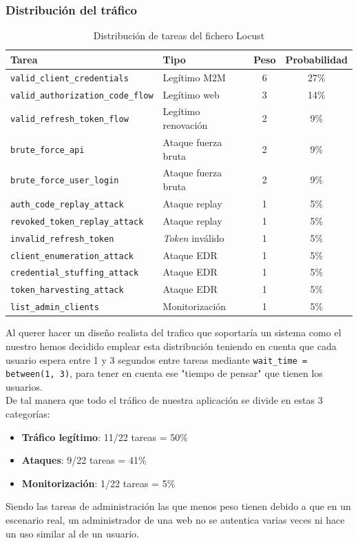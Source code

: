 \documentclass[12pt, a4paper]{article}
\begin{document}
		\subsubsection{Distribución del tráfico}
			\begin{table}[H]
				\centering
				\begin{tabular}{llcc}
					\toprule
					\textbf{Tarea} & \textbf{Tipo} & \textbf{Peso} & \textbf{Probabilidad} \\
					\midrule
					\texttt{valid\_client\_credentials}      & Legítimo M2M         & 6 & 27\% \\
					\texttt{valid\_authorization\_code\_flow} & Legítimo web         & 3 & 14\% \\
					\texttt{valid\_refresh\_token\_flow}      & Legítimo renovación  & 2 & 9\%  \\
					\texttt{brute\_force\_api}               & Ataque fuerza bruta  & 2 & 9\%  \\
					\texttt{brute\_force\_user\_login}        & Ataque fuerza bruta  & 2 & 9\%  \\
					\texttt{auth\_code\_replay\_attack}       & Ataque replay        & 1 & 5\%  \\
					\texttt{revoked\_token\_replay\_attack}   & Ataque replay        & 1 & 5\%  \\
					\texttt{invalid\_refresh\_token}          & \textit{Token }inválido       & 1 & 5\%  \\
					\texttt{client\_enumeration\_attack}      & Ataque EDR           & 1 & 5\%  \\
					\texttt{credential\_stuffing\_attack}     & Ataque EDR           & 1 & 5\%  \\
					\texttt{token\_harvesting\_attack}        & Ataque EDR           & 1 & 5\%  \\
					\texttt{list\_admin\_clients}             & Monitorización       & 1 & 5\%  \\
					\bottomrule
				\end{tabular}
				\caption{Distribución de tareas del fichero Locust}
			\end{table}
			Al querer hacer un diseño realista del trafico que soportaría un sistema como el nuestro hemos decidido emplear esta distribución teniendo en cuenta que cada usuario espera entre 1 y 3 segundos entre tareas mediante \texttt{wait\_time = between(1, 3)}, para tener en cuenta ese "tiempo de pensar" que tienen los usuarios.\\
			De tal manera que todo el tráfico de nuestra aplicación se divide en estas 3 categorías:
			\begin{itemize}
				\item \textbf{Tráfico legítimo}: 11/22 tareas = 50\%
				\item \textbf{Ataques}: 9/22 tareas = 41\%
				\item \textbf{Monitorización}: 1/22 tareas = 5\%
			\end{itemize}
			Siendo las tareas de administración las que menos peso tienen debido a que en un escenario real, un administrador de una web no se autentica varias veces ni hace un uso similar al de un usuario.
			
\end{document}
